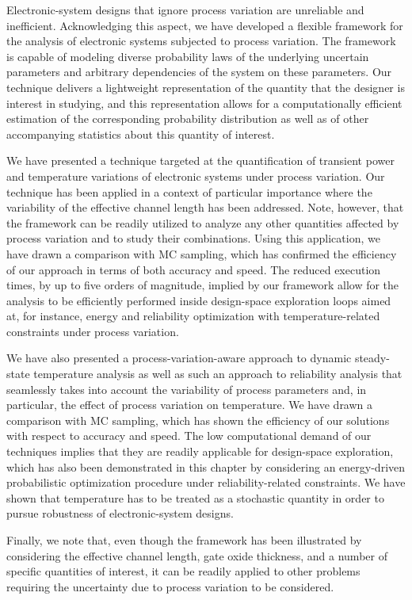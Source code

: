 Electronic-system designs that ignore process variation are unreliable and
inefficient. Acknowledging this aspect, we have developed a flexible framework
for the analysis of electronic systems subjected to process variation. The
framework is capable of modeling diverse probability laws of the underlying
uncertain parameters and arbitrary dependencies of the system on these
parameters. Our technique delivers a lightweight representation of the quantity
that the designer is interest in studying, and this representation allows for a
computationally efficient estimation of the corresponding probability
distribution as well as of other accompanying statistics about this quantity of
interest.

We have presented a technique targeted at the quantification of transient power
and temperature variations of electronic systems under process variation. Our
technique has been applied in a context of particular importance where the
variability of the effective channel length has been addressed. Note, however,
that the framework can be readily utilized to analyze any other quantities
affected by process variation and to study their combinations. Using this
application, we have drawn a comparison with \ac{MC} sampling, which has
confirmed the efficiency of our approach in terms of both accuracy and speed.
The reduced execution times, by up to five orders of magnitude, implied by our
framework allow for the analysis to be efficiently performed inside design-space
exploration loops aimed at, for instance, energy and reliability optimization
with temperature-related constraints under process variation.

We have also presented a process-variation-aware approach to dynamic
steady-state temperature analysis as well as such an approach to reliability
analysis that seamlessly takes into account the variability of process
parameters and, in particular, the effect of process variation on temperature.
We have drawn a comparison with \ac{MC} sampling, which has shown the efficiency
of our solutions with respect to accuracy and speed. The low computational
demand of our techniques implies that they are readily applicable for
design-space exploration, which has also been demonstrated in this chapter by
considering an energy-driven probabilistic optimization procedure under
reliability-related constraints. We have shown that temperature has to be
treated as a stochastic quantity in order to pursue robustness of
electronic-system designs.

Finally, we note that, even though the framework has been illustrated by
considering the effective channel length, gate oxide thickness, and a number of
specific quantities of interest, it can be readily applied to other problems
requiring the uncertainty due to process variation to be considered.
